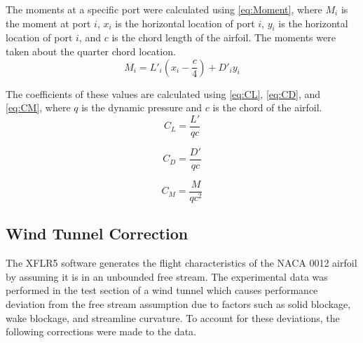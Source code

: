 \documentclass[journal,letterpaper]{IEEEtran}
\begin{document}
The moments at a specific port were calculated using \eqref{eq:Moment}, where $M_i$ is the moment at port $i$, $x_i$ is the horizontal location of port $i$, $y_i$ is the horizontal location of port $i$, and $c$ is the chord length of the airfoil. The moments were taken about the quarter chord location.
\begin{equation} \label{eq:Moment}
    M_i = L'_i\left(x_i - \frac{c}{4}\right) + D'_iy_i
\end{equation}

The coefficients of these values are calculated using \eqref{eq:CL}, \eqref{eq:CD}, and \eqref{eq:CM}, where $q$ is the dynamic pressure and $c$ is the chord of the airfoil.
\begin{equation} \label{eq:CL}
    C_L = \frac{L'}{qc}
\end{equation}

\begin{equation} \label{eq:CD}
    C_D = \frac{D'}{qc}
\end{equation}

\begin{equation} \label{eq:CM}
    C_M = \frac{M}{qc^2}
\end{equation}

\subsection{Wind Tunnel Correction}

The XFLR5 software generates the flight characteristics of the NACA 0012 airfoil by assuming it is in an unbounded free stream.
The experimental data was performed in the test section of a wind tunnel which causes performance deviation from the free stream assumption due to factors such as solid blockage, wake blockage, and streamline curvature.
To account for these deviations, the following corrections were made to the data.
\end{document}
